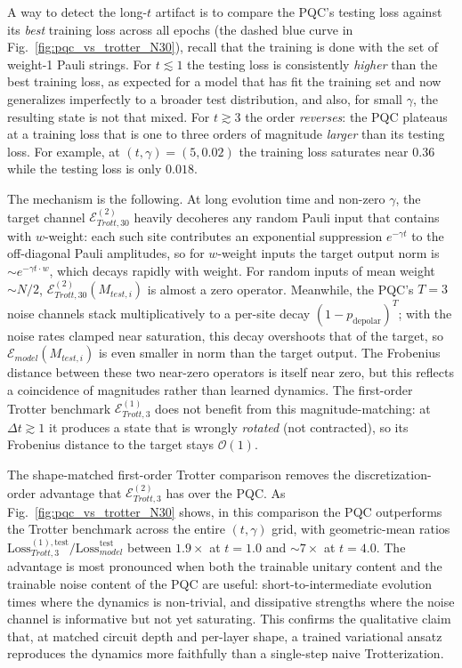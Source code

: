 \documentclass[%
 reprint,
superscriptaddress,
 amsmath,amssymb,
 aps,
]{revtex4-2}
\newcommand{\E}{\mathcal{E}}
\begin{document}
A way to detect the long-$t$ artifact is to compare the PQC's testing loss against its \emph{best} training loss across all epochs (the dashed blue curve in Fig.~\ref{fig:pqc_vs_trotter_N30}), recall that the training is done with the set of weight-1 Pauli strings. For $t\lesssim 1$ the testing loss is consistently \emph{higher} than the best training loss, as expected for a model that has fit the training set and now generalizes imperfectly to a broader test distribution, and also, for small $\gamma$, the resulting state is not that mixed. For $t\gtrsim 3$ the order \emph{reverses}: the PQC plateaus at a training loss that is one to three orders of magnitude \emph{larger} than its testing loss. For example, at $(t,\gamma)=(5,0.02)$ the training loss saturates near $0.36$ while the testing loss is only $0.018$. 


The mechanism is the following. At long evolution time and non-zero $\gamma$, the target channel $\E_{Trott,30}^{(2)}$ heavily decoheres any random Pauli input that contains with $w$-weight: each such site contributes an exponential suppression $e^{-\gamma t}$ to the off-diagonal Pauli amplitudes, so for $w$-weight inputs the target output norm is $\sim e^{-\gamma t\cdot w}$, which decays rapidly with weight. For random inputs of mean weight $\sim N/2$, $\E_{Trott,30}^{(2)}(M_{test,i})$ is almost a zero operator. Meanwhile, the PQC's $T=3$ noise channels stack multiplicatively to a per-site decay $(1-p_{\text{depolar}})^T$; with the noise rates clamped near saturation, this decay overshoots that of the target, so $\E_{model}(M_{test,i})$ is even smaller in norm than the target output. The Frobenius distance between these two near-zero operators is itself near zero, but this reflects a coincidence of magnitudes rather than learned dynamics. The first-order Trotter benchmark $\E_{Trott,3}^{(1)}$ does not benefit from this magnitude-matching: at $\Delta t\gtrsim 1$ it produces a state that is wrongly \emph{rotated} (not contracted), so its Frobenius distance to the target stays $\mathcal{O}(1)$.

The shape-matched first-order Trotter comparison removes the discretization-order advantage that $\E_{Trott,3}^{(2)}$ has over the PQC. As Fig.~\ref{fig:pqc_vs_trotter_N30} shows, in this comparison the PQC outperforms the Trotter benchmark across the entire $(t,\gamma)$ grid, with geometric-mean ratios $\text{Loss}_{Trott,3}^{(1),\text{test}}/\text{Loss}_{model}^{\text{test}}$ between $1.9\times$ at $t=1.0$ and $\sim 7\times$ at $t=4.0$. The advantage is most pronounced when both the trainable unitary content and the trainable noise content of the PQC are useful: short-to-intermediate evolution times where the dynamics is non-trivial, and dissipative strengths where the noise channel is informative but not yet saturating. This confirms the qualitative claim that, at matched circuit depth and per-layer shape, a trained variational ansatz reproduces the dynamics more faithfully than a single-step naive Trotterization.
\end{document}
